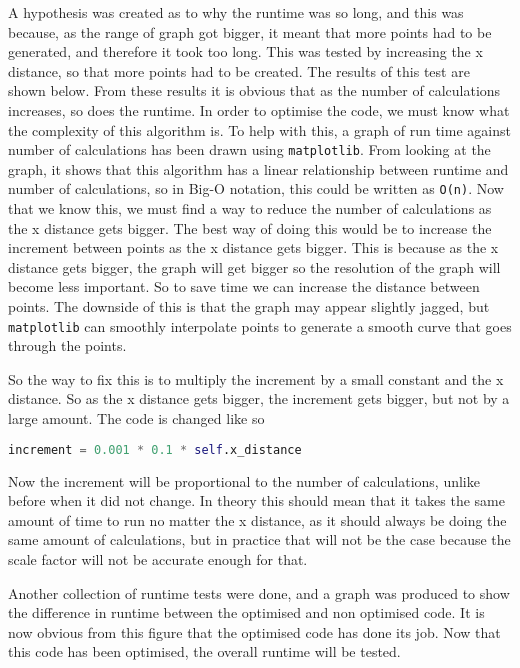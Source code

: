 A hypothesis was created as to why the runtime was so long, and this was because, as the range of graph got bigger, it meant that more points had to be generated, and therefore it took too long. This was tested by increasing the x distance, so that more points had to be created. The results of this test are shown below.
From these results it is obvious that as the number of calculations increases, so does the runtime. In order to optimise the code, we must know what the complexity of this algorithm is. To help with this, a graph of run time against number of calculations has been drawn using \texttt{matplotlib}.
From looking at the graph, it shows that this algorithm has a linear relationship between runtime and number of calculations, so in Big-O notation, this could be written as \texttt{O(n)}. Now that we know this, we must find a way to reduce the number of calculations as the x distance gets bigger. The best way of doing this would be to increase the increment between points as the x distance gets bigger. This is because as the x distance gets bigger, the graph will get bigger so the resolution of the graph will become less important. So to save time we can increase the distance between points. The downside of this is that the graph may appear slightly jagged, but \texttt{matplotlib} can smoothly interpolate points to generate a smooth curve that goes through the points.

So the way to fix this is to multiply the increment by a small constant and the x distance. So as the x distance gets bigger, the increment gets bigger, but not by a large amount. The code is changed like so
\begin{lstlisting}[language=Python, caption=Optimisation change to graph generation]
increment = 0.001 * 0.1 * self.x_distance
\end{lstlisting}
Now the increment will be proportional to the number of calculations, unlike before when it did not change. In theory this should mean that it takes the same amount of time to run no matter the x distance, as it should always be doing the same amount of calculations, but in practice that will not be the case because the scale factor will not be accurate enough for that.

Another collection of runtime tests were done, and a graph was produced to show the difference in runtime between the optimised and non optimised code.
It is now obvious from this figure that the optimised code has done its job. Now that this code has been optimised, the overall runtime will be tested.

